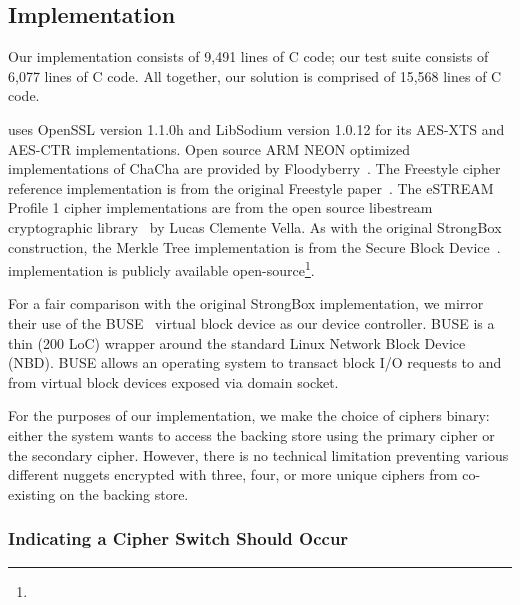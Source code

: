 {\subsection{Implementation}

Our \SYSTEM{} implementation consists of 9,491 lines of C code; our test suite
consists of 6,077 lines of C code. All together, our solution is comprised of
15,568 lines of C code.

\SYSTEM{} uses OpenSSL version 1.1.0h and LibSodium version 1.0.12 for its
AES-XTS and AES-CTR implementations. Open source ARM NEON optimized
implementations of ChaCha are provided by Floodyberry~\cite{Floodyberry}. The
Freestyle cipher reference implementation is from the original Freestyle
paper~\cite{Freestyle}. The eSTREAM Profile 1 cipher implementations are from
the open source libestream cryptographic library~\cite{libestream} by Lucas
Clemente Vella. As with the original StrongBox construction, the Merkle Tree
implementation is from the Secure Block Device~\cite{SBD}. \SYSTEM{}
implementation is publicly available open-source\footnote{\SystemURI}.

For a fair comparison with the original StrongBox implementation, we mirror
their use of the BUSE~\cite{BUSE} virtual block device as our device controller.
BUSE is a thin (200 LoC) wrapper around the standard Linux Network Block Device
(NBD). BUSE allows an operating system to transact block I/O requests to and
from virtual block devices exposed via domain socket.

For the purposes of our implementation, we make the choice of ciphers binary:
either the system wants \SYSTEM{} to access the backing store using the primary
cipher or the secondary cipher. However, there is no technical limitation
preventing various different nuggets encrypted with three, four, or more unique
ciphers from co-existing on the backing store. 

\subsubsection{Indicating a Cipher Switch Should Occur}

}
